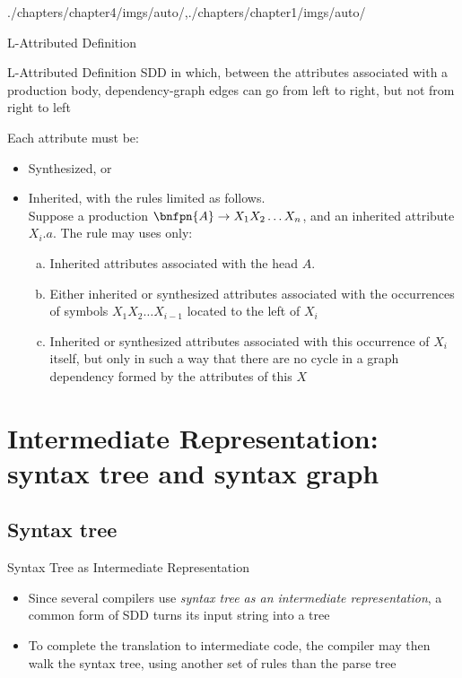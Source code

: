 \begin{graphicspathcontext}{{./chapters/chapter4/imgs/auto/},{./chapters/chapter1/imgs/auto/}}
\begin{bibunit}[apalike]
\begin{frame}{L-Attributed Definition}
	\begin{footnotesize}
	\begin{definitionblock}{L-Attributed Definition}
		SDD in which, between the attributes associated with a production body, dependency-graph edges can go from left to right, but not from right to left
	\end{definitionblock}
	\vspace{.5cm}
	Each attribute must be:
	\begin{itemize}
	\item Synthesized, or
	\item Inherited, with the rules limited as follows. \\
		Suppose a production $\bnfpn{A} \bnfopo X_1 X_2 \dots X_n$, and an inherited attribute $X_i.a$. The rule may uses only:
		\begin{enumerate}[a)]\footnotesize
		\item Inherited attributes associated with the head $A$.
		\item Either inherited or synthesized attributes associated with the occurrences of symbols $X_1 X_2 \dots X_{i-1}$ located to the left of $X_i$
		\item Inherited or synthesized attributes associated with this occurrence of $X_i$ itself, but only in such a way that there are no cycle in a graph dependency formed by the attributes of this $X$
		\end{enumerate}
	\end{itemize}
	\end{footnotesize}
\end{frame}

\section{Intermediate Representation: syntax tree and syntax graph}
\sectiontableofcontentslide*

\subsection{Syntax tree}

\begin{frame}[background=6]{{Syntax Tree} as Intermediate Representation}
	\begin{itemize}
		\item Since several compilers use \emph{syntax tree as an intermediate representation}, a common form of SDD turns its input string into a tree
		\vfill
		\item To complete the translation to intermediate code, the compiler may then walk the syntax tree, using another set of rules than the parse tree
	\end{itemize}
\end{frame}


\end{bibunit}
\end{graphicspathcontext}
